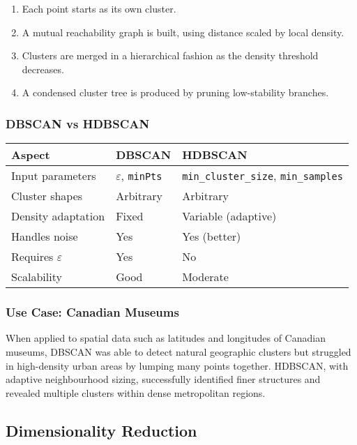 \documentclass[9pt]{extarticle}
\begin{document}
\begin{enumerate}
    \item Each point starts as its own cluster.
    \item A mutual reachability graph is built, using distance scaled by local density.
    \item Clusters are merged in a hierarchical fashion as the density threshold decreases.
    \item A condensed cluster tree is produced by pruning low-stability branches.
\end{enumerate}

\subsubsection{DBSCAN vs HDBSCAN}

\begin{center}
\begin{tabular}{|l|l|l|}
\hline
\textbf{Aspect} & \textbf{DBSCAN} & \textbf{HDBSCAN} \\
\hline
Input parameters & $\varepsilon$, \texttt{minPts} & \texttt{min\_cluster\_size}, \texttt{min\_samples} \\
Cluster shapes & Arbitrary & Arbitrary \\
Density adaptation & Fixed & Variable (adaptive) \\
Handles noise & Yes & Yes (better) \\
Requires $\varepsilon$ & Yes & No \\
Scalability & Good & Moderate \\
\hline
\end{tabular}
\end{center}

\subsubsection{Use Case: Canadian Museums}

When applied to spatial data such as latitudes and longitudes of Canadian museums, DBSCAN was able to detect natural geographic clusters but struggled in high-density urban areas by lumping many points together. HDBSCAN, with adaptive neighbourhood sizing, successfully identified finer structures and revealed multiple clusters within dense metropolitan regions.

\subsection{Dimensionality Reduction}
\end{document}
